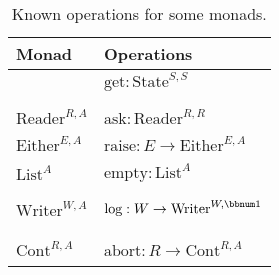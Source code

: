 \begin{wraptable}{l}{0.6\columnwidth}%
\begin{centering}
\vspace{-0.35\baselineskip}
\begin{tabular}{|>{\centering}m{1.3cm}|>{\centering}m{7cm}|}
\hline 
\textbf{\small{}Monad} & \textbf{\small{}Operations}\tabularnewline
\hline 
\hline 
{\small{}$\text{State}^{S,A}$} & {\small{}$\text{get}:\text{State}^{S,S}$}\\
{\small{}$\text{set}:S\rightarrow\text{State}^{S,\bbnum 1}$}\\
{\small{}$\text{update}:(S\rightarrow S)\rightarrow\text{State}^{S,\bbnum 1}$}\tabularnewline
\hline 
{\small{}$\text{Reader}^{R,A}$} & {\small{}$\text{ask}:\text{Reader}^{R,R}$}\\
{\small{}$\text{local}:R\times\text{Reader}^{R,A}\rightarrow\text{Reader}^{R,A}$}\tabularnewline
\hline 
{\small{}$\text{Either}^{E,A}$} & {\small{}$\text{raise}:E\rightarrow\text{Either}^{E,A}$}\\
{\small{}$\text{handle}:(E\rightarrow\text{Either}^{E,A})\times\text{Either}^{E,A}\rightarrow\text{Either}^{E,A}$}\tabularnewline
\hline 
{\small{}$\text{List}^{A}$} & {\small{}$\text{empty}:\text{List}^{A}$}\\
{\small{}$\text{append}:\text{List}^{A}\times\text{List}^{A}\rightarrow\text{List}^{A}$}\\
{\small{}$\text{filter}:\text{List}^{A}\times(A\rightarrow\bbnum 2)\rightarrow\text{List}^{A}$}\tabularnewline
\hline 
{\small{}$\text{Writer}^{W,A}$} & {\small{}$\text{log}:W\rightarrow\text{Writer}^{W,\bbnum 1}$}\\
{\small{}$\text{collect}:\text{Writer}^{W,A}\rightarrow\text{Writer}^{W,A\times W}$}\\
{\small{}$\text{process}:\text{Writer}^{W,A\times(W\rightarrow W)}\rightarrow\text{Writer}^{W,A}$}\\
{\small{}$\text{clear}:\text{Writer}^{W,A}\rightarrow\text{Writer}^{W,A}$}\tabularnewline
\hline 
{\small{}$\text{Cont}^{R,A}$} & {\small{}$\text{abort}:R\rightarrow\text{Cont}^{R,A}$}\\
{\small{}$\text{callcc}:((A\rightarrow\text{Cont}^{R,B})\rightarrow\text{Cont}^{R,A})\rightarrow\text{Cont}^{R,A}$}\tabularnewline
\hline 
\end{tabular}
\par\end{centering}
\caption{Known operations for some monads.\label{tab:effectful-operations-for-some-monads}}
\vspace{-0.4\baselineskip}
\end{wraptable}%


